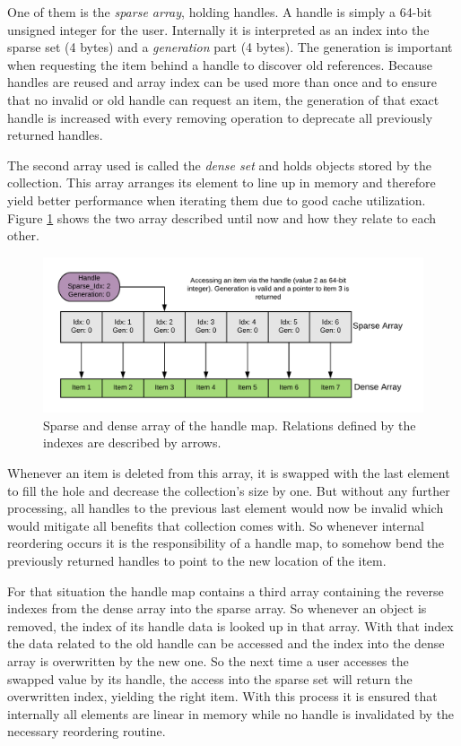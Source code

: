 One of them is the \textit{sparse array}, holding handles. A handle is simply a 64-bit unsigned integer for the user. Internally it is interpreted as an index into the sparse set (4 bytes) and a \textit{generation} part (4 bytes). The generation is important when requesting the item behind a handle to discover old references. Because handles are reused and array index can be used more than once and to ensure that no invalid or old handle can request an item, the generation of that exact handle is increased with every removing operation to deprecate all previously returned handles. 

The second array used is called the \textit{dense set} and holds objects stored by the collection. This array arranges its element to line up in memory and therefore yield better performance when iterating them due to good cache utilization. Figure \ref{fig:handle_map} shows the two array described until now and how they relate to each other.

\begin{figure}[h!]
	\centering \includegraphics[width=\linewidth]{PICs/handle_map.png}
	\caption{Sparse and dense array of the handle map. Relations defined by the indexes are described by arrows.}
	\label{fig:handle_map}
\end{figure}

\noindent
Whenever an item is deleted from this array, it is swapped with the last element to fill the hole and decrease the collection's size by one. But without any further processing, all handles to the previous last element would now be invalid which would mitigate all benefits that collection comes with. So whenever internal reordering occurs it is the responsibility of a handle map, to somehow bend the previously returned handles to point to the new location of the item.

For that situation the handle map contains a third array containing the reverse indexes from the dense array into the sparse array. So whenever an object is removed, the index of its handle data is looked up in that array. With that index the data related to the old handle can be accessed and the index into the dense array is overwritten by the new one. So the next time a user accesses the swapped value by its handle, the access into the sparse set will return the overwritten index, yielding the right item. With this process it is ensured that internally all elements are linear in memory while no handle is invalidated by the necessary reordering routine. 

